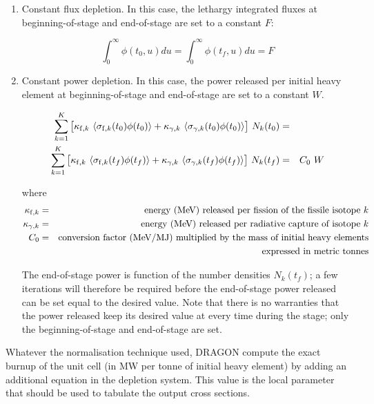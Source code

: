 \begin{enumerate}

\item Constant flux depletion. In this case, the lethargy integrated fluxes at
beginning-of-stage and end-of-stage are set to a constant $F$:

\begin{equation}
\int_0^\infty{\phi(t_0,u) du}=\int_0^\infty{\phi(t_f,u) du}=F
\end{equation}

\item Constant power depletion. In this case, the power released per initial heavy element at
beginning-of-stage and end-of-stage are set to a constant $W$.

\vskip -0.5cm

\begin{eqnarray}
\nonumber \sum^K_{k=1} \big[ \kappa_{{\rm f},k} \ \langle \sigma_{{\rm f},k}(t_0) \phi(t_0) \rangle +\kappa_{\gamma,k} \ \langle
\sigma_{\gamma,k}(t_0) \phi(t_0) \rangle \big]  \ N_k(t_0) &=& \\
\sum^K_{k=1} \big[ \kappa_{{\rm f},k} \ \langle \sigma_{{\rm f},k}(t_f) \phi(t_f) \rangle +\kappa_{\gamma,k} \ \langle \sigma_{\gamma,k}
(t_f) \phi(t_f) \rangle \big]\ N_k(t_f) &=& C_0 \ W
\end{eqnarray}

\noindent where
\begin{eqnarray}
\nonumber \kappa_{{\rm f},k} &=& \hbox{energy (MeV) released per fission of the fissile isotope $k$}
\\
\nonumber \kappa_{\gamma,k} &=& \hbox{energy (MeV) released per radiative capture of isotope $k$}
\\
\nonumber C_0 &=& \hbox{conversion factor (MeV/MJ) multiplied by the mass of initial heavy
elements}
\\
\nonumber &~& \hbox{expressed in metric tonnes} 
\end{eqnarray}

The end-of-stage power is function of the number densities $N_k(t_f)$; a few iterations will
therefore be required before the end-of-stage power released can be set equal to the desired
value. Note that there is no warranties that the power released keep its desired value at every time
during the stage; only the beginning-of-stage and end-of-stage are set.

\end{enumerate}

Whatever the normalisation technique used, DRAGON compute the exact burnup of the unit cell
(in MW per tonne of initial heavy element) by adding an additional equation in the depletion
system. This value is the local parameter that should be used to tabulate the output cross
sections.

